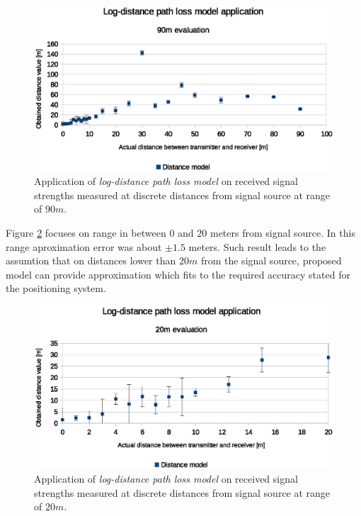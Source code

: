 \documentclass[../main.tex]{subfiles}
\begin{document}
\begin{figure}[ht]
\includegraphics[width=\textwidth, keepaspectratio]{pictures/tests_case1_distance_model_90m}
\centering
\caption{Application of \textit{log-distance path loss model} on received signal strengths measured at discrete distances from signal source at range of $90m$.}
\label{fig:tests_case1_distance_model_90m}
\end{figure}


Figure \ref{fig:tests_case1_distance_model_20m} focuses on range in between $0$ and $20$ meters from signal source. In this range aproximation error was about $\pm 1.5$ meters. Such result leads to the assumtion that on distances lower than $20m$ from the signal source, proposed model can provide approximation which fits to the required accuracy stated for the positioning system.

\begin{figure}[ht]
\includegraphics[width=\textwidth, keepaspectratio]{pictures/tests_case1_distance_model_20m}
\centering
\caption{Application of \textit{log-distance path loss model} on received signal strengths measured at discrete distances from signal source at range of $20m$.}
\label{fig:tests_case1_distance_model_20m}
\end{figure}
\end{document}
